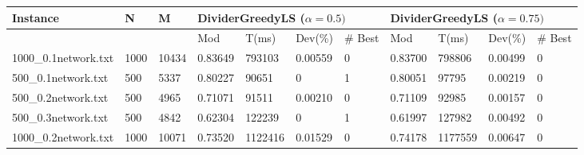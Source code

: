 \begin{sidewaystable}
	\begin{tabular}{lllllllllll}
		\hline
		\multicolumn{1}{|l|}{Instance}             & \multicolumn{1}{l|}{N}    & \multicolumn{1}{l|}{M}     & \multicolumn{4}{l|}{DividerGreedyLS ($\alpha = 0.5)$}                                                                                  & \multicolumn{4}{l|}{DividerGreedyLS ($\alpha = 0.75)$}                                                                                 \\ \hline
		\multicolumn{1}{|l|}{}                     & \multicolumn{1}{l|}{}     & \multicolumn{1}{l|}{}      & \multicolumn{1}{l|}{Mod}     & \multicolumn{1}{l|}{T(ms)}   & \multicolumn{1}{l|}{Dev(\%)} & \multicolumn{1}{l|}{\# Best} & \multicolumn{1}{l|}{Mod}     & \multicolumn{1}{l|}{T(ms)}   & \multicolumn{1}{l|}{Dev(\%)} & \multicolumn{1}{l|}{\# Best} \\ \hline
		\multicolumn{1}{|l|}{1000\_0.1network.txt} & \multicolumn{1}{l|}{1000} & \multicolumn{1}{l|}{10434} & \multicolumn{1}{l|}{0.83649} & \multicolumn{1}{l|}{793103}  & \multicolumn{1}{l|}{0.00559} & \multicolumn{1}{l|}{0}       & \multicolumn{1}{l|}{0.83700} & \multicolumn{1}{l|}{798806}  & \multicolumn{1}{l|}{0.00499} & \multicolumn{1}{l|}{0}       \\ \hline
		\multicolumn{1}{|l|}{500\_0.1network.txt}  & \multicolumn{1}{l|}{500}  & \multicolumn{1}{l|}{5337}  & \multicolumn{1}{l|}{0.80227} & \multicolumn{1}{l|}{90651}   & \multicolumn{1}{l|}{0}       & \multicolumn{1}{l|}{1}       & \multicolumn{1}{l|}{0.80051} & \multicolumn{1}{l|}{97795}   & \multicolumn{1}{l|}{0.00219} & \multicolumn{1}{l|}{0}       \\ \hline
		\multicolumn{1}{|l|}{500\_0.2network.txt}  & \multicolumn{1}{l|}{500}  & \multicolumn{1}{l|}{4965}  & \multicolumn{1}{l|}{0.71071} & \multicolumn{1}{l|}{91511}   & \multicolumn{1}{l|}{0.00210} & \multicolumn{1}{l|}{0}       & \multicolumn{1}{l|}{0.71109} & \multicolumn{1}{l|}{92985}   & \multicolumn{1}{l|}{0.00157} & \multicolumn{1}{l|}{0}       \\ \hline
		\multicolumn{1}{|l|}{500\_0.3network.txt}  & \multicolumn{1}{l|}{500}  & \multicolumn{1}{l|}{4842}  & \multicolumn{1}{l|}{0.62304} & \multicolumn{1}{l|}{122239}  & \multicolumn{1}{l|}{0}       & \multicolumn{1}{l|}{1}       & \multicolumn{1}{l|}{0.61997} & \multicolumn{1}{l|}{127982}  & \multicolumn{1}{l|}{0.00492} & \multicolumn{1}{l|}{0}       \\ \hline
		\multicolumn{1}{|l|}{1000\_0.2network.txt} & \multicolumn{1}{l|}{1000} & \multicolumn{1}{l|}{10071} & \multicolumn{1}{l|}{0.73520} & \multicolumn{1}{l|}{1122416} & \multicolumn{1}{l|}{0.01529} & \multicolumn{1}{l|}{0}       & \multicolumn{1}{l|}{0.74178} & \multicolumn{1}{l|}{1177559} & \multicolumn{1}{l|}{0.00647} & \multicolumn{1}{l|}{0}       \\ \hline

\end{tabular}
\end{sidewaystable}
